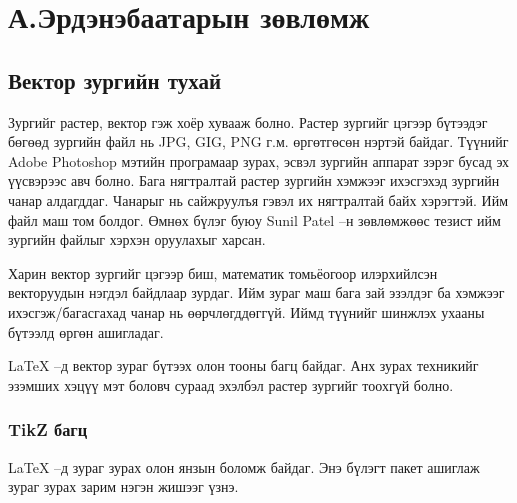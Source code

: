 
\chapter{А.Эрдэнэбаатарын зөвлөмж} %

\label{Chapter2} %
\pagecolor{white}

\section{Вектор зургийн тухай}

Зургийг растер, вектор гэж хоёр хувааж болно. Растер зургийг цэгээр бүтээдэг бөгөөд зургийн файл нь JPG, GIG, PNG г.м. өргөтгөсөн нэртэй байдаг. Түүнийг Adobe Photoshop мэтийн програмаар зурах, эсвэл зургийн аппарат зэрэг бусад эх үүсвэрээс авч болно. Бага нягтралтай растер зургийн хэмжээг ихэсгэхэд зургийн чанар алдагддаг. Чанарыг нь сайжруулъя гэвэл их нягтралтай байх хэрэгтэй. Ийм файл маш том болдог. Өмнөх бүлэг буюу Sunil Patel --н зөвлөмжөөс тезист ийм зургийн файлыг хэрхэн оруулахыг харсан.

Харин вектор зургийг цэгээр биш, математик томьёогоор илэрхийлсэн векторуудын нэгдэл байдлаар зурдаг. Ийм зураг маш бага зай эзэлдэг ба хэмжээг ихэсгэж/багасгахад чанар нь өөрчлөгддөггүй. Иймд түүнийг шинжлэх ухааны бүтээлд өргөн ашигладаг.

\LaTeX{} --д вектор зураг бүтээх олон тооны багц байдаг. Анх зурах техникийг эзэмших хэцүү мэт боловч сураад эхэлбэл растер зургийг тоохгүй болно.   

\subsection{TikZ багц}

\LaTeX{} --д зураг зурах олон янзын боломж байдаг. Энэ бүлэгт  пакет ашиглаж зураг зурах зарим нэгэн жишээг үзнэ. 

